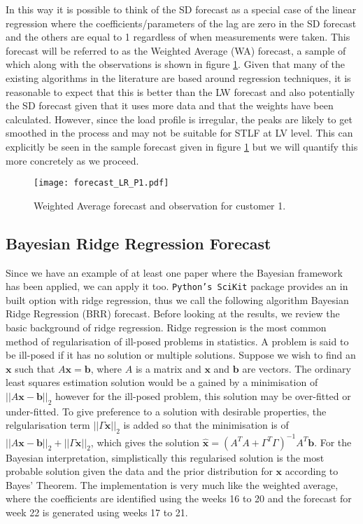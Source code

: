 In this way it is possible to think of the SD forecast as a special case of the linear regression where the coefficients/parameters of the lag are zero in the SD forecast and the others are equal to 1 regardless of when measurements were taken. This forecast will be referred to as the Weighted Average (WA) forecast, a sample of which along with the observations is shown in figure \ref{fig:LR_forecast_P1}. Given that many of the existing algorithms in the literature are based around regression techniques, it is reasonable to expect that this is better than the LW forecast and also potentially the SD forecast given that it uses more data and that the weights have been calculated. However, since the load profile is irregular, the peaks are likely to get smoothed in the process and may not be suitable for STLF at LV level. This can explicitly be seen in the sample forecast given in figure \ref{fig:LR_forecast_P1} but we will quantify this more concretely as we proceed. %
\begin{figure}
\centering
\texttt{[image: forecast\_LR\_P1.pdf]}
\caption{Weighted Average forecast and observation for customer 1.}
\label{fig:LR_forecast_P1} 
\end{figure}

\subsection{Bayesian Ridge Regression Forecast} %

Since we have an example of at least one paper \citep{douglas98} where the Bayesian framework has been applied, we can apply it too. \texttt{Python's SciKit} package provides an in built option with ridge regression, thus we call the following algorithm Bayesian Ridge Regression (BRR) forecast. Before looking at the results, we review the basic background of ridge regression. Ridge regression is the most common method of regularisation of ill-posed problems in statistics. A problem is said to be ill-posed if it has no solution or multiple solutions. Suppose we wish to find an $\boldsymbol{x}$ such that $A\boldsymbol{x}=\boldsymbol{b}$, where $A$ is a matrix and $\boldsymbol{x}$ and $\boldsymbol{b}$ are vectors. The ordinary least squares estimation solution would be a gained by a minimisation of $||A\boldsymbol{x} - \boldsymbol{b}||_2$ however for the ill-posed problem, this solution may be over-fitted or under-fitted. To give preference to a solution with desirable properties, the relgularisation term $||\Gamma\boldsymbol{x}||_2$ is added so that the minimisation is of $||A\boldsymbol{x} - \boldsymbol{b}||_2 + ||\Gamma\boldsymbol{x}||_2$, which gives the solution $\hat{\boldsymbol{x}} = \left(A^T A + \Gamma^T \Gamma \right)^{-1} A^T \boldsymbol{b}$. For the Bayesian interpretation, simplistically this regularised solution is the most probable solution given the data and the prior distribution for $\boldsymbol{x}$ according to Bayes' Theorem. The implementation is very much like the weighted average, where the coefficients are identified using the weeks 16 to 20 and the forecast for week 22 is generated using weeks 17 to 21.

